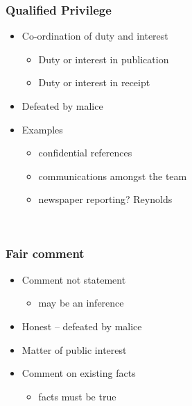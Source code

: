 \documentclass[ignorenonframetext,]{beamer}
\begin{document}
\begin{frame}
\frametitle{Qualified Privilege}

\begin{itemize}
\item  Co-ordination of duty and interest

  \begin{itemize}
  \item    Duty or interest in publication
  \item    Duty or interest in receipt
  \end{itemize}
\item  Defeated by {malice}
\item  Examples

  \begin{itemize}
  \item    confidential references
  \item    communications amongst the team
  \item    newspaper reporting? {Reynolds}
  \end{itemize}
\end{itemize}

~


\end{frame}

\begin{frame}
\frametitle{Fair comment}

\begin{itemize}
\item  Comment not statement

  \begin{itemize}
  \item    may be an inference
  \end{itemize}
\item  Honest -- defeated by {malice }
\item  {Matter of public interest}
\item  {Comment on existing facts}

  \begin{itemize}
  \item    {facts must be true}
  \end{itemize}
\end{itemize}

~


\end{frame}
\end{document}
